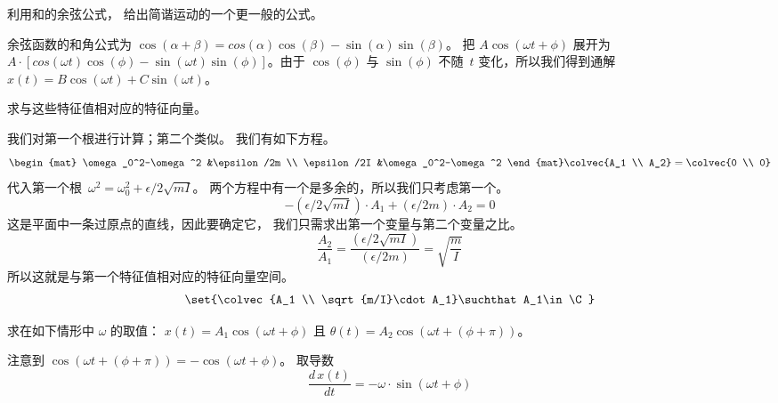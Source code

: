\begin{exercises}
\item 利用和的余弦公式，
  给出简谐运动的一个更一般的公式。
  \begin{answer}
    余弦函数的和角公式为
    $\cos(\alpha+\beta)=cos(\alpha)\cos(\beta)-\sin(\alpha)\sin(\beta)$。
    把 $A\cos(\omega t+\phi)$ 展开为 $A\cdot[cos(\omega
    t)\cos(\phi)-\sin(\omega t)\sin(\phi)]$。由于 $\cos(\phi)$ 与
    $\sin(\phi)$ 不随~$t$ 变化，所以我们得到通解
    $x(t)=B\cos(\omega t)+C\sin(\omega t)$。
  \end{answer}
\item 求与这些特征值相对应的特征向量。
  \begin{answer}
    我们对第一个根进行计算；第二个类似。
    我们有如下方程。
    \begin{equation*}
      \begin{mat}
        \omega_0^2-\omega^2  &\epsilon/2m \\
        \epsilon/2I         &\omega_0^2-\omega^2
      \end{mat}
      \colvec{A_1 \\ A_2}
      =\colvec{0 \\ 0}
    \end{equation*}
    代入第一个根~$\omega^2=\omega_0^2+\epsilon/2\sqrt{mI}$。
    两个方程中有一个是多余的，所以我们只考虑第一个。
    \begin{equation*}
      -(\epsilon/2\sqrt{mI})\cdot A_1+(\epsilon/2m)\cdot A_2=0
    \end{equation*}
    这是平面中一条过原点的直线，因此要确定它，
    我们只需求出第一个变量与第二个变量之比。
    \begin{equation*}
      \frac{A_2}{A_1}=\frac{(\epsilon/2\sqrt{mI})}{(\epsilon/2m)}
                     =\sqrt{\frac{m}{I}}
    \end{equation*}
    所以这就是与第一个特征值相对应的特征向量空间。
    \begin{equation*}
      \set{\colvec{A_1 \\ \sqrt{m/I}\cdot A_1}\suchthat A_1\in\C}
    \end{equation*}
  \end{answer}
\item 求在如下情形中 $\omega$ 的取值：
  $x(t)=A_1\cos(\omega t+\phi)$
  且 $\theta(t)=A_2\cos(\omega t+(\phi+\pi))$。
  \begin{answer}
    注意到 $\cos(\omega t+(\phi+\pi))=-\cos(\omega t+\phi)$。
    取导数
    \begin{equation*}
      \frac{d\,x(t)}{dt}=-\omega\cdot\sin(\omega t+\phi)

\end{equation*}
\end{answer}
\end{exercises}
